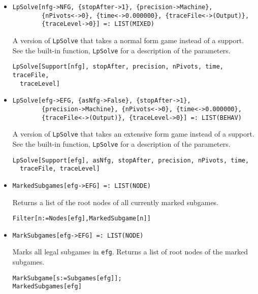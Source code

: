 \begin{itemize}
\item{}
\protect \large \begin{verbatim}
LpSolve[nfg->NFG, {stopAfter->1}, {precision->Machine}, 
        {nPivots<->0}, {time<->0.000000}, {traceFile<->(Output)}, 
        {traceLevel->0}] =: LIST(MIXED) 
\end{verbatim}\normalsize

\bd 
A version of \verb+LpSolve+ that takes a normal form
game instead of a support.  See the built-in function,
\verb+LpSolve+ for a description of the parameters.
\begin{verbatim}
LpSolve[Support[nfg], stopAfter, precision, nPivots, time, traceFile, 
  traceLevel]
\end{verbatim} 
\ed

\item{}
\protect \large \begin{verbatim}
LpSolve[efg->EFG, {asNfg->False}, {stopAfter->1},
        {precision->Machine}, {nPivots<->0}, {time<->0.000000}, 
        {traceFile<->(Output)}, {traceLevel->0}] =: LIST(BEHAV) 
\end{verbatim}\normalsize

\bd 
A version of \verb+LpSolve+ that takes an extensive form
game instead of a support.  See the built-in function,
\verb+LpSolve+ for a description of the parameters.
\begin{verbatim}
LpSolve[Support[efg], asNfg, stopAfter, precision, nPivots, time, 
  traceFile, traceLevel]
\end{verbatim} 
\ed


\item{}
\protect \large \begin{verbatim}
MarkedSubgames[efg->EFG] =: LIST(NODE) 
\end{verbatim}\normalsize

\bd 
Returns a list of the root nodes of all currently marked subgames.  
\begin{verbatim}
Filter[n:=Nodes[efg],MarkedSubgame[n]]
\end{verbatim} 
\ed

\item{}
\protect \large \begin{verbatim}
MarkSubgames[efg->EFG] =: LIST(NODE) 
\end{verbatim}\normalsize

\bd 
Marks all legal subgames in \verb+efg+.  Returns a list of root nodes
of the marked subgames.  
\begin{verbatim}
MarkSubgame[s:=Subgames[efg]];
MarkedSubgames[efg]
\end{verbatim} 
\ed



\end{itemize}
